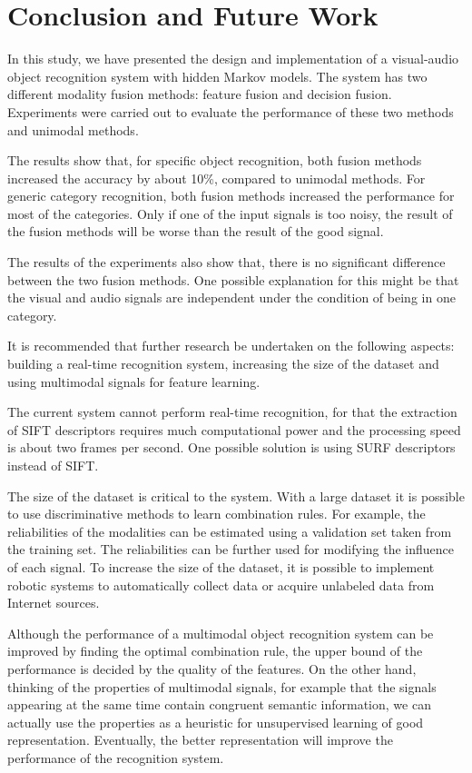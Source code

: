 \documentclass[letterpaper, 10 pt, conference]{ieeeconf}
\begin{document}
\section{Conclusion and Future Work}
In this study, we have presented the design and implementation of a visual-audio object recognition system with hidden Markov models. The system has two different modality fusion methods: feature fusion and decision fusion. Experiments were carried out to evaluate the performance of these two methods and unimodal methods.

The results show that, for specific object recognition, both fusion methods increased the accuracy by about 10\%, compared to unimodal methods. For generic category recognition, both fusion methods increased the performance for most of the categories. Only if one of the input signals is too noisy, the result of the fusion methods will be worse than the result of the good signal.

The results of the experiments also show that, there is no significant difference between the two fusion methods. One possible explanation for this might be that the visual and audio signals are independent under the condition of being in one category.

It is recommended that further research be undertaken on the following aspects: building a real-time recognition system, increasing the size of the dataset and using multimodal signals for feature learning.

The current system cannot perform real-time recognition, for that the extraction of SIFT descriptors requires much computational power and the processing speed is about two frames per second. One possible solution is using SURF descriptors instead of SIFT.

The size of the dataset is critical to the system. With a large dataset it is possible to use discriminative methods to learn combination rules. For example, the reliabilities of the modalities can be estimated using a validation set taken from the training set. The reliabilities can be further used for modifying the influence of each signal. To increase the size of the dataset, it is possible to implement robotic systems to automatically collect data or acquire unlabeled data from Internet sources.

Although the performance of a multimodal object recognition system can be improved by finding the optimal combination rule, the upper bound of the performance is decided by the quality of the features. On the other hand, thinking of the properties of multimodal signals, for example that the signals appearing at the same time contain congruent semantic information, we can actually use the properties as a heuristic for unsupervised learning of good representation. Eventually, the better representation will improve the performance of the recognition system.
\end{document}
